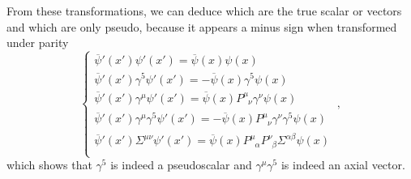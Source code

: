     From these transformations, we can deduce which are the true scalar or vectors and which are only pseudo, because it appears a minus sign when transformed under parity
    \begin{equation*}
        \begin{cases}
            \overline \psi'(x') \psi'(x') = \overline \psi(x) \psi(x) \\
            \overline \psi'(x') \gamma^5 \psi'(x') = - \overline \psi(x) \gamma^5 \psi(x) \\
            \overline \psi'(x')\gamma^\mu \psi'(x') = \overline \psi(x) P^\mu_{\phantom \mu \nu} \gamma^\nu \psi(x) \\
            \overline \psi'(x') \gamma^\mu \gamma^5 \psi'(x') = -\overline \psi(x) P^\mu_{\phantom \mu \nu} \gamma^\nu \gamma^5 \psi(x) \\
            \overline \psi'(x') \Sigma^{\mu\nu} \psi'(x') = \overline \psi(x) P^\mu_{\phantom \mu \alpha} P^\nu_{\phantom \nu \beta} \Sigma^{\alpha \beta} \psi(x) \\
        \end{cases} ~,
    \end{equation*}
    which shows that $\gamma^5$ is indeed a pseudoscalar and $\gamma^\mu \gamma^5$ is indeed an axial vector.
